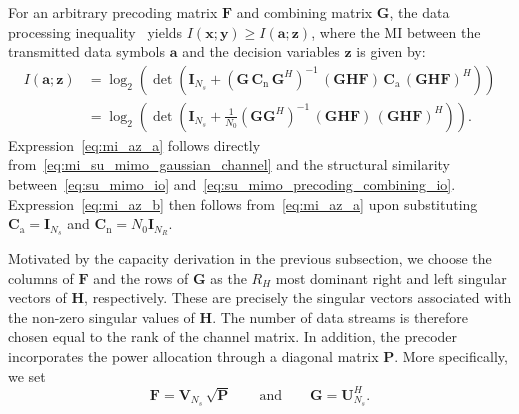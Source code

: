 For an arbitrary precoding matrix $\mathbf{F}$ and combining matrix $\mathbf{G}$, the data processing inequality~\cite{cover_thomas_2005} yields $I(\mathbf{x}; \mathbf{y}) \geq I(\mathbf{a}; \mathbf{z})$, where the \ac{MI} between the transmitted data symbols $\mathbf{a}$ and the decision variables $\mathbf{z}$ is given by:
\begin{subequations}
\label{eq:mi_az}
\begin{align}
    I(\mathbf{a}; \mathbf{z}) 
    &= \log_2\!\left(\det\!\left(\mathbf{I}_{N_s} + (\mathbf{G} \, \mathbf{C}_{\mathrm{n}} \, \mathbf{G}^H)^{-1} \, (\mathbf{G} \mathbf{H} \mathbf{F}) \, \mathbf{C}_{\mathrm{a}} \, (\mathbf{G} \mathbf{H} \mathbf{F})^H\right)\right) \label{eq:mi_az_a} \\
    &= \log_2\!\left(\det\!\left(\mathbf{I}_{N_s} + \tfrac{1}{N_0}(\mathbf{G} \mathbf{G}^H)^{-1} \, (\mathbf{G} \mathbf{H} \mathbf{F}) \, (\mathbf{G} \mathbf{H} \mathbf{F})^H\right)\right) \label{eq:mi_az_b}.
\end{align}
\end{subequations}
Expression~\eqref{eq:mi_az_a} follows directly from~\eqref{eq:mi_su_mimo_gaussian_channel} and the structural similarity between~\eqref{eq:su_mimo_io} and~\eqref{eq:su_mimo_precoding_combining_io}.
Expression~\eqref{eq:mi_az_b} then follows from~\eqref{eq:mi_az_a} upon substituting $\mathbf{C}_{\mathrm{a}} = \mathbf{I}_{N_s}$ and $\mathbf{C}_{\mathrm{n}} = N_0 \mathbf{I}_{N_R}$.

Motivated by the capacity derivation in the previous subsection, we choose the columns of $\mathbf{F}$ and the rows of $\mathbf{G}$ as the $R_H$ most dominant right and left singular vectors of $\mathbf{H}$, respectively.
These are precisely the singular vectors associated with the non-zero singular values of $\mathbf{H}$. The number of data streams is therefore chosen equal to the rank of the channel matrix.
In addition, the precoder incorporates the power allocation through a diagonal matrix $\mathbf{P}$.
More specifically, we set
\begin{equation}
\label{eq:su_mimo_optimal_precoder_and_combiner}
    \mathbf{F} = \mathbf{V}_{N_s} \, \sqrt{\mathbf{P}} \qquad \text{and} \qquad \mathbf{G} = \mathbf{U}_{N_s}^H.
\end{equation}

